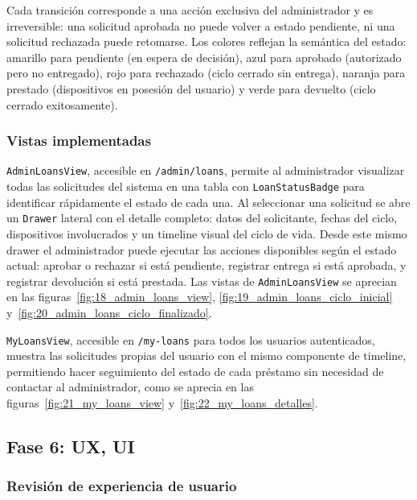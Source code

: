 Cada transición corresponde a una acción exclusiva del administrador y es 
irreversible: una solicitud aprobada no puede volver a estado pendiente, ni una 
solicitud rechazada puede retomarse. Los colores reflejan la semántica del estado: 
amarillo para pendiente (en espera de decisión), azul para aprobado (autorizado pero 
no entregado), rojo para rechazado (ciclo cerrado sin entrega), naranja para prestado 
(dispositivos en posesión del usuario) y verde para devuelto (ciclo cerrado 
exitosamente).

\subsubsection*{Vistas implementadas}

\texttt{AdminLoansView}, accesible en \texttt{/admin/loans}, permite al administrador 
visualizar todas las solicitudes del sistema en una tabla con \texttt{LoanStatusBadge} 
para identificar rápidamente el estado de cada una. Al seleccionar una solicitud se 
abre un \texttt{Drawer} lateral con el detalle completo: datos del solicitante, 
fechas del ciclo, dispositivos involucrados y un timeline visual del ciclo de vida. 
Desde este mismo drawer el administrador puede ejecutar las acciones disponibles 
según el estado actual: aprobar o rechazar si está pendiente, registrar entrega si 
está aprobada, y registrar devolución si está prestada. Las vistas de 
\texttt{AdminLoansView} se aprecian en las 
figuras~\ref{fig:18_admin_loans_view}, \ref{fig:19_admin_loans_ciclo_inicial} 
y~\ref{fig:20_admin_loans_ciclo_finalizado}.

\texttt{MyLoansView}, accesible en \texttt{/my-loans} para todos los usuarios 
autenticados, muestra las solicitudes propias del usuario con el mismo componente de 
timeline, permitiendo hacer seguimiento del estado de cada préstamo sin necesidad de 
contactar al administrador, como se aprecia en las 
figuras~\ref{fig:21_my_loans_view} y~\ref{fig:22_my_loans_detalles}.

\subsection{Fase 6: UX, UI}\label{sec:hito4_frontend_fase_6}

\subsubsection*{Revisión de experiencia de usuario}

